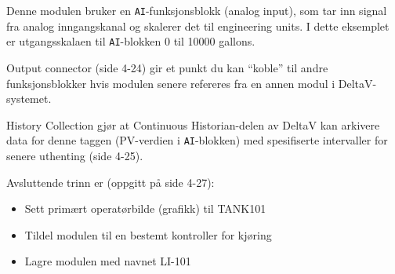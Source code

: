 
Denne modulen bruker en {\tt AI}-funksjonsblokk (analog input), som tar inn signal fra analog inngangskanal og skalerer det til engineering units. I dette eksemplet er utgangsskalaen til {\tt AI}-blokken 0 til 10000 gallons.

\vskip 10pt

Output connector (side 4-24) gir et punkt du kan ``koble'' til andre funksjonsblokker hvis modulen senere refereres fra en annen modul i DeltaV-systemet.

\vskip 10pt

History Collection gjør at Continuous Historian-delen av DeltaV kan arkivere data for denne taggen (PV-verdien i {\tt AI}-blokken) med spesifiserte intervaller for senere uthenting (side 4-25).

\vskip 10pt

Avsluttende trinn er (oppgitt på side 4-27):

\begin{itemize}
\item{} Sett primært operatørbilde (grafikk) til TANK101
\item{} Tildel modulen til en bestemt kontroller for kjøring
\item{} Lagre modulen med navnet LI-101
\end{itemize}


